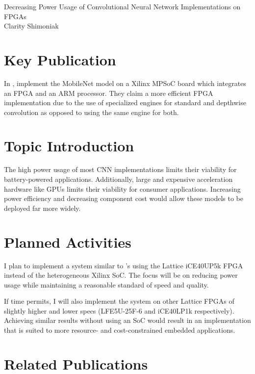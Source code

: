 \documentclass[12pt,letterpaper,english]{article}
\begin{document}
\begin{center}
	{\LARGE%
		Decreasing Power Usage of
		Convolutional Neural Network Implementations
		on FPGAs
	} \\
	\vspace{6pt}
	Clarity Shimoniak
	\vspace{-18pt}
\end{center}

\section*{Key Publication}

In  \autocite{mobilenet2019fpga},
\citeauthor{mobilenet2019fpga} implement the MobileNet model
\autocites{mobilenetv1}{mobilenetv2} on a Xilinx MPSoC board which integrates an
FPGA and an ARM processor. They claim a more efficient FPGA implementation due
to the use of specialized engines for standard and depthwise convolution as
opposed to using the same engine for both.


\section*{Topic Introduction}

The high power usage of most CNN implementations limits their viability for
battery-powered applications. Additionally, large and expensive acceleration
hardware like GPUs limits their viability for consumer applications. Increasing
power efficiency and decreasing component cost would allow these models to be
deployed far more widely.


\section*{Planned Activities}

I plan to implement a system similar to \citeauthor*{mobilenet2019fpga}'s using
the Lattice iCE40UP5k FPGA instead of the heterogeneous Xilinx SoC. The focus
will be on reducing power usage while maintaining a reasonable standard of speed
and quality.

If time permits, I will also implement the system on other Lattice FPGAs of
slightly higher and lower specs (LFE5U-25F-6 and iCE40LP1k respectively).
Achieving similar results without using an SoC would result in an implementation
that is suited to more resource- and cost-constrained embedded applications.


\section*{Related Publications}
\end{document}
